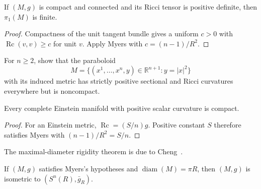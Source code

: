 \begin{corollary}
\label{cor:positive-ricci-finite-fundamental-group}
If $(M,g)$ is compact and connected and its Ricci tensor is positive definite,
then $\pi_1(M)$ is finite.
\end{corollary}

\begin{proof}
\sketch
Compactness of the unit tangent bundle gives a uniform $c>0$ with
$\operatorname{Rc}(v,v)\geq c$ for unit $v$.  Apply Myers with
$c=(n-1)/R^2$.
\end{proof}

\begin{exercise}
\label{exer:paraboloid-positive-curvature}
For $n\geq2$, show that the paraboloid
\[
M=\{(x^1,\ldots,x^n,y)\in\mathbb R^{n+1}:y=|x|^2\}
\]
with its induced metric has strictly positive sectional and Ricci curvatures
everywhere but is noncompact.
\end{exercise}

\begin{corollary}
\label{cor:einstein-positive-scalar-curvature-compact}
Every complete Einstein manifold with positive scalar curvature is compact.
\end{corollary}

\begin{proof}
\sketch
For an Einstein metric, $\operatorname{Rc}=(S/n)g$.  Positive constant $S$
therefore satisfies Myers with $(n-1)/R^2=S/n$.
\end{proof}

The maximal-diameter rigidity theorem is due to Cheng~\cite{Che75}.

\begin{theorem}
\label{thm:chengs-maximal-diameter}
If $(M,g)$ satisfies Myers's hypotheses and
$\operatorname{diam}(M)=\pi R$, then $(M,g)$ is isometric to
$(S^n(R),\bar g_R)$.
\end{theorem}

